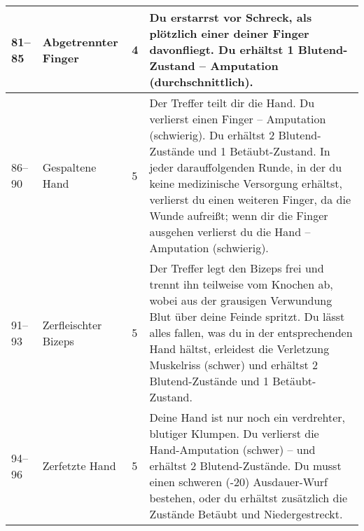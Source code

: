 \documentclass[a4paper, fontsize=8.5pt]{scrartcl}
\begin{document}
\begin{table}[!ht]
\begin{tabularx}{\textwidth}{lp{2.5cm}lX}
        81–85         & Abgetrennter Finger        & 4           & Du erstarrst vor Schreck, als plötzlich einer deiner Finger davonfliegt. Du erhältst 1 Blutend-Zustand – Amputation (durchschnittlich).                                                                                                                                                                                                                                                                                                                                                                                                                                                                                                                    \\ \hline
        86–90         & Gespaltene Hand            & 5           & Der Treffer teilt dir die Hand. Du verlierst einen Finger – Amputation (schwierig). Du erhältst 2 Blutend-Zustände und 1 Betäubt-Zustand. In jeder darauffolgenden Runde, in der du keine medizinische Versorgung erhältst, verlierst du einen weiteren Finger, da die Wunde aufreißt; wenn dir die Finger ausgehen verlierst du die Hand – Amputation (schwierig).                                                                                                                                                                                                                                                                                        \\ \hline
        91–93         & Zerfleischter Bizeps       & 5           & Der Treffer legt den Bizeps frei und trennt ihn teilweise vom Knochen ab, wobei aus der grausigen Verwundung Blut über deine Feinde spritzt. Du lässt alles fallen, was du in der entsprechenden Hand hältst, erleidest die Verletzung Muskelriss (schwer) und erhältst 2 Blutend-Zustände und 1 Betäubt-Zustand.                                                                                                                                                                                                                                                                                                                                          \\ \hline
        94–96         & Zerfetzte Hand             & 5           & Deine Hand ist nur noch ein verdrehter, blutiger Klumpen. Du verlierst die Hand-Amputation (schwer) – und erhältst 2 Blutend-Zustände. Du musst einen schweren (-20) Ausdauer-Wurf bestehen, oder du erhältst zusätzlich die Zustände Betäubt und Niedergestreckt.                                                                                                                                                                                                                                                                                                                                                                                         \\ \hline

\end{tabularx}
\end{table}
\end{document}
